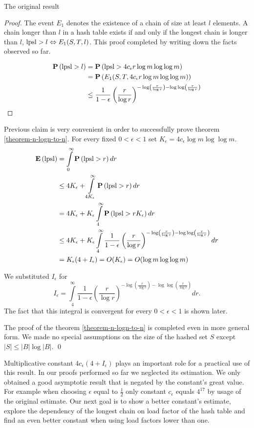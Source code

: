 \begin{section}{The original result}
\begin{proof}
The event $E_1$ denotes the existence of a chain of size at least $l$ elements. A chain longer than $l$ in a hash table exists if and only if the longest chain is longer than $l$, $\mathrm{lpsl} > l \Leftrightarrow E_1(S, T, l)$. This proof completed by writing down the facts observed so far.

\[
\begin{split}
\mathbf{P}\left(\mathrm{lpsl} > l\right) 
	& = \mathbf{P}\left(\mathrm{lpsl} > 4c_{\epsilon} r \log m \log \log m\right) \\
	& = \mathbf{P}\left(E_1(S, T, 4c_{\epsilon} r \log m \log \log m)\right) \\
	& \leq \frac{1}{1 - \epsilon} \left(\frac{r}{\log r}\right)^{-\log \left(\frac{r}{\log r}\right) - \log \log \left(\frac{r}{\log r}\right)} \\
\end{split}
\]
\end{proof}

Previous claim is very convenient in order to successfully prove theorem \ref{theorem-n-logn-to-n}. For every fixed $0 < \epsilon < 1$ set $K_\epsilon = 4 c_\epsilon \log m \log \log m$.
\[
\begin{split}
\mathbf{E}\left(\mathrm{lpsl}\right)
	& = \int\limits_0^{\infty} \mathbf{P}\left(\mathrm{lpsl} > r\right) dr \\
	& \leq 4K_\epsilon + \int\limits_{4K_\epsilon}^\infty \mathbf{P}\left(\mathrm{lpsl} > r\right) dr \\
	& = 4K_\epsilon + K_\epsilon \int\limits_4^\infty \mathbf{P}\left(\mathrm{lpsl} > rK_\epsilon\right) dr \\
	& \leq 4K_\epsilon + K_\epsilon \int\limits_4^\infty \frac{1}{1 - \epsilon} \left(\frac{r}{\log r}\right)^{-\log \left(\frac{r}{\log r}\right) - \log \log \left(\frac{r}{\log r}\right)} dr \\
	& = K_\epsilon(4 + I_\epsilon) = O(K_\epsilon) = O(\log m \log \log m)
\end{split}
\]

We substituted $I_\epsilon$ for
\[
I_\epsilon = \int\limits_4^\infty \frac{1}{1 - \epsilon} \left(\frac{r}{\log r}\right)^{-\log \left(\frac{r}{\log r}\right) - \log \log \left(\frac{r}{\log r}\right)} dr \text{.}
\]
The fact that this integral is convergent for every $0 < \epsilon < 1$ is shown later.

The proof of the theorem \ref{theorem-n-logn-to-n} is completed even in more general form. We made no special assumptions on the size of the hashed set $S$ except $|S| \leq |B| \log |B|$. \qed

\mbox{\qedhere}

Multiplicative constant $4 c_\epsilon(4 + I_\epsilon)$ plays an important role for a practical use of this result. In our proofs performed so far we neglected its estimation. We only obtained a good asymptotic result that is negated by the constant's great value. For example when choosing $\epsilon$ equal to $\frac{1}{2}$ only constant $c_\epsilon$ equals $4 ^ {17}$ by usage of the original estimate. Our next goal is to show a better constant's estimate, explore the dependency of the longest chain on load factor of the hash table and find an even better constant when using load factors lower than one.
\end{section}

